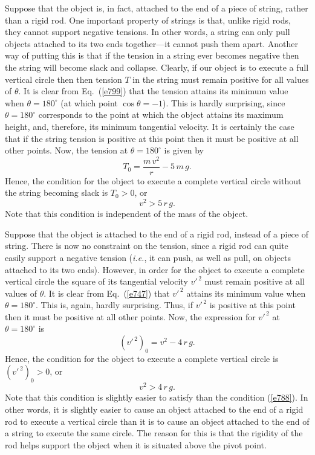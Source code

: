 Suppose that the object is, in fact, attached to the end of a piece of string, rather than a
rigid rod. One important property of strings is that, unlike rigid rods, they cannot
support negative tensions. In other words, a string can only pull objects attached to its
two ends together---it cannot push them apart. Another way of putting this is that if the
tension in a string ever becomes negative then the string will become slack and collapse.
Clearly, if our object is to execute a full vertical circle then then tension $T$ in the
string must
remain positive for all values of $\theta$. It is clear from Eq.~(\ref{e799}) that the
tension attains its minimum value when $\theta =180^\circ$ (at which point $\cos\theta=-1$). This
is hardly surprising, since $\theta=180^\circ$ corresponds to the point at which the
object attains its maximum height, and, therefore, its minimum tangential velocity. It is certainly
the case that if the string tension is positive at this point then it must be positive
at all other points. Now, the tension at $\theta=180^\circ$ is given by
\begin{equation}
T_0 =  \frac{m\,v^2}{r} -5\,m\,g.
\end{equation}
Hence, the condition for the object to execute a complete vertical circle without the
string becoming slack is $T_0>0$, or
\begin{equation}\label{e788}
v^2 > 5\,r\,g.
\end{equation}
Note that this condition is independent of the mass of the object.

Suppose that the object is attached to the end of a rigid rod, instead of a
piece of string. There is now no constraint on the tension, since a rigid rod can
quite easily support a negative tension ({\em i.e.}, it can push, as well as pull, on objects
attached to its two ends). 
However, in order for the object to execute a complete vertical circle the square of its
tangential velocity ${v'}^{\,2}$ must remain positive at all values of $\theta$. 
It is clear from Eq.~(\ref{e747}) that 
${v'}^{\,2}$ attains its minimum value when $\theta =180^\circ$. This
is, again, hardly surprising. Thus, if ${v'}^{\,2}$ is positive at this point then it must be positive
at all other points. Now, the expression for ${v'}^{\,2}$ at $\theta=180^\circ$ is
\begin{equation}
({v'}^{\,2})_0 = v^2 - 4\,r\,g.
\end{equation}
Hence, the condition for the object to execute a complete vertical circle is $({v'}^{\,2})_0 >0$, or
\begin{equation}
v^2 > 4\,r\,g.
\end{equation}
Note that this condition is slightly easier to satisfy than the condition (\ref{e788}). In other words,
it is slightly easier to cause an object attached to the end of a rigid rod to execute a
vertical circle than it is to cause an object attached to the end of a string
to execute the same circle. The reason for this is that the rigidity of the rod
helps support the object when it is situated above the pivot point.

